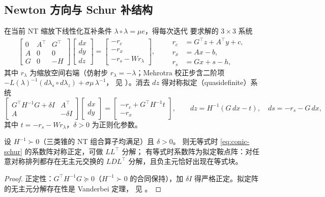 \subsection{Newton 方向与 Schur 补结构}

在当前 NT 缩放下线性化互补条件 $\lambda \circ \lambda = \mu e$，得每次迭代
要求解的 $3 \times 3$ 系统
\begin{equation}
\label{eq:conic-newton}
\begin{bmatrix} 0 & A^\top & G^\top \\ A & 0 & 0 \\ G & 0 & -H \end{bmatrix}
\begin{bmatrix} dx \\ dy \\ dz \end{bmatrix}
=
\begin{bmatrix} -r_c \\ -r_x \\ -r_s - W r_\lambda \end{bmatrix},
\qquad
\begin{aligned}
r_c &= G^\top z + A^\top y + c,\\
r_x &= Ax - b,\\
r_s &= Gx + s - h,
\end{aligned}
\end{equation}
其中 $r_\lambda$ 为缩放空间右端（仿射步 $r_\lambda = -\lambda$；Mehrotra
校正步含二阶项 $-L(\lambda)^{-1}(d\lambda_s \circ d\lambda_z) + \sigma\mu\,\lambda^{-1}$，
见 \cite{vandenberghe2010}）。消去 $dz$ 得对称拟定（quasidefinite）系统
\begin{equation}
\label{eq:conic-schur}
\begin{bmatrix} G^\top H^{-1} G + \delta I & A^\top \\ A & -\delta I \end{bmatrix}
\begin{bmatrix} dx \\ dy \end{bmatrix}
=
\begin{bmatrix} -r_c + G^\top H^{-1} t \\ -r_x \end{bmatrix},
\qquad
dz = H^{-1}(G\,dx - t),\quad ds = -r_s - G\,dx ,
\end{equation}
其中 $t = -r_s - W r_\lambda$，$\delta > 0$ 为正则化参数。

\begin{proposition}
\label{prop:quasidefinite}
设 $H^{-1} \succ 0$（三类锥的 NT 组合算子均满足）且 $\delta > 0$。
则无等式时 \eqref{eq:conic-schur} 的系数阵对称正定，可做 $LL^\top$ 分解；
有等式时系数阵为拟定鞍点阵：对任意对称排列都存在无主元交换的
$LDL^\top$ 分解，且负主元恰好出现在等式块。
\end{proposition}
\begin{proof}
正定性：$G^\top H^{-1}G \succeq 0$（$H^{-1} \succ 0$ 的合同保持），加
$\delta I$ 得严格正定。拟定阵的无主元分解存在性是 Vanderbei 定理，
见 \cite{vanderbei1995}。
\end{proof}

